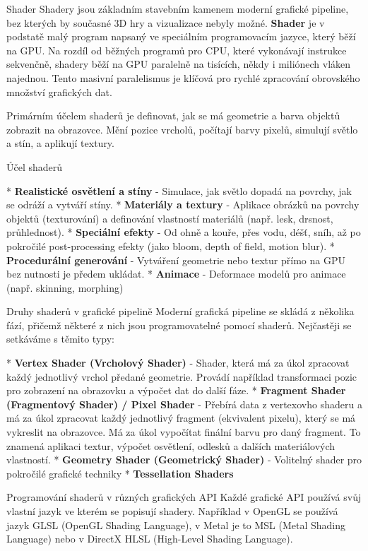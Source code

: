 \chap Shader
Shadery jsou základním stavebním kamenem moderní grafické pipeline, bez kterých by současné 3D hry a vizualizace nebyly možné. {\bf Shader} je v podstatě malý program napsaný ve speciálním programovacím jazyce, který běží na GPU. Na rozdíl od běžných programů pro CPU, které vykonávají instrukce sekvenčně, shadery běží na GPU paralelně na tisících, někdy i miliónech vláken najednou. Tento masivní paralelismus je klíčová pro rychlé zpracování obrovského množství grafických dat.  

Primárním účelem shaderů je definovat, jak se má geometrie a barva objektů zobrazit na obrazovce. Mění pozice vrcholů, počítají barvy pixelů, simulují světlo a stín, a aplikují textury.

\sec Účel shaderů

\begitems
* {\bf Realistické osvětlení a stíny} - Simulace, jak světlo dopadá na povrchy, jak se odráží a vytváří stíny.
* {\bf Materiály a textury} - Aplikace obrázků na povrchy objektů (texturování) a definování vlastností materiálů (např. lesk, drsnost, průhlednost).
* {\bf Speciální efekty} - Od ohně a kouře, přes vodu, déšť, sníh, až po pokročilé post-processing efekty (jako bloom, depth of field, motion blur).
* {\bf Procedurální generování} - Vytváření geometrie nebo textur přímo na GPU bez nutnosti je předem ukládat.
* {\bf Animace} - Deformace modelů pro animace (např. skinning, morphing)
\enditems


\sec Druhy shaderů v grafické pipelině
Moderní grafická pipeline se skládá z několika fází, přičemž některé z nich jsou programovatelné pomocí shaderů. Nejčastěji se setkáváme s těmito typy:

\begitems
* {\bf Vertex Shader (Vrcholový Shader)} - Shader, která má za úkol zpracovat každý jednotlivý vrchol předané geometrie. Provádí například transformaci pozic pro zobrazení na obrazovku a výpočet dat do další fáze. 
* {\bf Fragment Shader (Fragmentový Shader) / Pixel Shader} - Přebírá data z vertexovho shaderu a má za úkol zpracovat každý jednotlivý fragment (ekvivalent pixelu), který se má vykreslit na obrazovce. Má za úkol vypočítat finální barvu pro daný fragment. To znamená aplikaci textur, výpočet osvětlení, odlesků a dalších materiálových vlastností. 
* {\bf Geometry Shader (Geometrický Shader)} - Volitelný shader pro pokročilé grafické techniky
* {\bf Tessellation Shaders}  
\enditems

\sec Programování shaderů v různých grafických API
Každé grafické API používá svůj vlastní jazyk ve kterém se popisují shadery. Například v OpenGL se používá jazyk GLSL (OpenGL Shading Language), v Metal je to MSL (Metal Shading Language) nebo v DirectX HLSL (High-Level Shading Language). 

